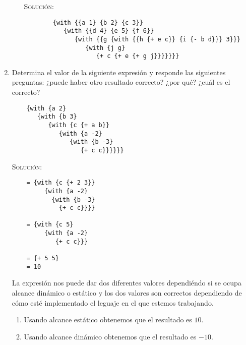 \documentclass[letterpaper,11pt]{article}
\begin{document}
\begin{enumerate}
\begin{enumerate}
        \textsc{Solución:}
        \begin{verbatim}
        {with {{a 1} {b 2} {c 3}} 
           {with {{d 4} {e 5} {f 6}} 
              {with {{g {with {{h {+ e c}} {i {- b d}}} 3}}}
              	 {with {j g}
                 	{+ c {+ e {+ g j}}}}}}}
        \end{verbatim}
    \end{enumerate}

    \item Determina el valor de la siguiente expresión y responde las siguientes 
    preguntas: ¿puede haber otro resultado correcto? ¿por qué? ¿cuál es el 
    correcto? 
    \begin{verbatim}
    {with {a 2} 
       {with {b 3} 
          {with {c {+ a b}} 
             {with {a -2} 
                {with {b -3} 
                   {+ c c}}}}}}
    \end{verbatim}

    \textsc{Solución:} 
    \begin{verbatim}
    = {with {c {+ 2 3}} 
         {with {a -2} 
           {with {b -3} 
             {+ c c}}}}

    = {with {c 5} 
         {with {a -2} 
            {+ c c}}}

    = {+ 5 5}
    = 10
    \end{verbatim}

    La expresión nos puede dar dos diferentes valores dependiéndo si se ocupa 
    alcance dinámico o estático y los dos valores son correctos dependiendo de 
    cómo esté implementado el leguaje en el que estemos trabajando.
    \begin{enumerate}
        \item Usando alcance estático obtenemos que el resultado es $10$.
        \item Usando alcance dinámico obtenemos que el resultado es $-10$.
    \end{enumerate}
\end{enumerate}
\end{document}
